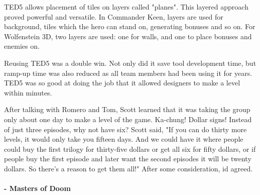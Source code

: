 \documentclass[book.tex]{subfiles}
\begin{document}
 \par
 TED5 allows placement of tiles on layers called "planes". This layered approach proved powerful and versatile. In Commander Keen, layers are used for background, tiles which the hero can stand on, generating bonuses and so on. For Wolfenstein 3D, two layers are used: one for walls, and one to place bonuses and enemies on.\\
 \par

Reusing TED5 was a double win. Not only did it save tool development time, but ramp-up time was also reduced as all team members had been using it for years. TED5 was so good at doing the job that it allowed designers to make a level within minutes.\\
\par

 \begin{fancyquotes}
After talking with Romero and Tom, Scott learned that it was taking the group only about one day to make a level of the game. Ka-chung! Dollar signs! Instead of just three episodes, why not have six? Scott said, "If you can do thirty more levels, it would only take you fifteen days. And we could have it where people could buy the first trilogy for thirty-five dollars or get all six for fifty dollars, or if people buy the first episode and later want the second episodes it will be twenty dollars. So there's a reason to get them all!" After some consideration, id agreed.\\
\\
 \textbf{- Masters of Doom}
 \end{fancyquotes}\\
\end{document}
